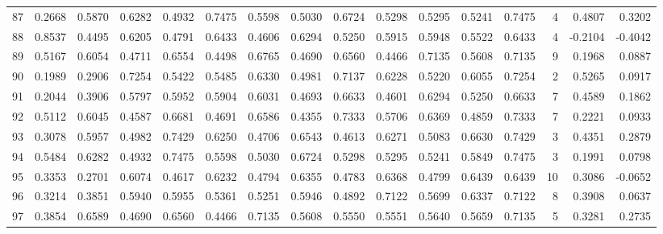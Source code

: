 \begin{tabular}{lrrrrrrrrrrrrrrr}
87  &      0.2668 &  0.5870 &  0.6282 &  0.4932 &  0.7475 &  0.5598 &  0.5030 &  0.6724 &  0.5298 &  0.5295 &   0.5241 &     0.7475 &      4 &                    0.4807 &                     0.3202 \\
88  &      0.8537 &  0.4495 &  0.6205 &  0.4791 &  0.6433 &  0.4606 &  0.6294 &  0.5250 &  0.5915 &  0.5948 &   0.5522 &     0.6433 &      4 &                   -0.2104 &                    -0.4042 \\
89  &      0.5167 &  0.6054 &  0.4711 &  0.6554 &  0.4498 &  0.6765 &  0.4690 &  0.6560 &  0.4466 &  0.7135 &   0.5608 &     0.7135 &      9 &                    0.1968 &                     0.0887 \\
90  &      0.1989 &  0.2906 &  0.7254 &  0.5422 &  0.5485 &  0.6330 &  0.4981 &  0.7137 &  0.6228 &  0.5220 &   0.6055 &     0.7254 &      2 &                    0.5265 &                     0.0917 \\
91  &      0.2044 &  0.3906 &  0.5797 &  0.5952 &  0.5904 &  0.6031 &  0.4693 &  0.6633 &  0.4601 &  0.6294 &   0.5250 &     0.6633 &      7 &                    0.4589 &                     0.1862 \\
92  &      0.5112 &  0.6045 &  0.4587 &  0.6681 &  0.4691 &  0.6586 &  0.4355 &  0.7333 &  0.5706 &  0.6369 &   0.4859 &     0.7333 &      7 &                    0.2221 &                     0.0933 \\
93  &      0.3078 &  0.5957 &  0.4982 &  0.7429 &  0.6250 &  0.4706 &  0.6543 &  0.4613 &  0.6271 &  0.5083 &   0.6630 &     0.7429 &      3 &                    0.4351 &                     0.2879 \\
94  &      0.5484 &  0.6282 &  0.4932 &  0.7475 &  0.5598 &  0.5030 &  0.6724 &  0.5298 &  0.5295 &  0.5241 &   0.5849 &     0.7475 &      3 &                    0.1991 &                     0.0798 \\
95  &      0.3353 &  0.2701 &  0.6074 &  0.4617 &  0.6232 &  0.4794 &  0.6355 &  0.4783 &  0.6368 &  0.4799 &   0.6439 &     0.6439 &     10 &                    0.3086 &                    -0.0652 \\
96  &      0.3214 &  0.3851 &  0.5940 &  0.5955 &  0.5361 &  0.5251 &  0.5946 &  0.4892 &  0.7122 &  0.5699 &   0.6337 &     0.7122 &      8 &                    0.3908 &                     0.0637 \\
97  &      0.3854 &  0.6589 &  0.4690 &  0.6560 &  0.4466 &  0.7135 &  0.5608 &  0.5550 &  0.5551 &  0.5640 &   0.5659 &     0.7135 &      5 &                    0.3281 &                     0.2735 \\

\end{tabular}
